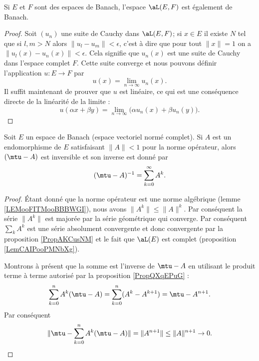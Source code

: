\begin{lemma}       \label{LemCAIPooPMNbXg}
    Si \( E\) et \( F\) sont des espaces de Banach, l'espace \( \aL(E,F)\) est également de Banach.
\end{lemma}

\begin{proof}
    Soit \( (u_n)\) une suite de Cauchy dans \( \aL(E,F)\); si \( x\in E\) il existe \( N\) tel que si \( l,m>N\) alors \( \| u_l-u_m \|<\epsilon\), c'est à dire que pour tout \( \| x \|=1\) on a \( \| u_l(x)-u_n(x) \|<\epsilon\). Cela signifie que \( u_n(x)\) est une suite de Cauchy dans l'espace complet \( F\). Cette suite converge et nous pouvons définir l'application \( u\colon E\to F\) par
    \begin{equation}
        u(x)=\lim_{n\to \infty} u_n(x).
    \end{equation}
    Il suffit maintenant de prouver que \( u\) est linéaire, ce qui est une conséquence directe de la linéarité de la limite :
    \begin{equation}
        u(\alpha x+\beta y)=\lim_{n\to \infty} \big( \alpha u_n(x)+\beta u_n(y) \big).
    \end{equation}
\end{proof}

\begin{proposition}     \label{PropQAjqUNp}
    Soit \( E\) un espace de Banach (espace vectoriel normé complet). Si \( A\) est un endomorphisme de \( E\) satisfaisant  \( \| A \|<1\) pour la norme opérateur, alors \( (\mtu-A)\) est inversible et son inverse est donné par
    \begin{equation}
        (\mtu-A)^{-1}=\sum_{k=0}^{\infty}A^k.
    \end{equation}
\end{proposition}

\begin{proof}
    Étant donné que la norme opérateur est une norme algébrique (lemme \ref{LEMooFITMooBBBWGI}), nous avons \( \| A^k \|\leq \| A \|^k\). Par conséquent la série \( \| A^k \|\) est majorée par la série géométrique qui converge. Par conséquent \( \sum_{k}A^k\) est une série absolument convergente et donc convergente par la proposition \ref{PropAKCusNM} et le fait que \( \aL(E)\) est complet (proposition \ref{LemCAIPooPMNbXg}).
    
    Montrons à présent que la somme est l'inverse de \( \mtu-A\) en utilisant le produit terme à terme autorisé par la proposition \ref{PropQXqEPuG} :
    \begin{equation}
        \sum_{k=0}^nA^k(\mtu-A)=\sum_{k=0}^n(A^k-A^{k+1})=\mtu-A^{n+1}.
    \end{equation}
    Par conséquent 
    \begin{equation}
        \| \mtu-\sum_{k=0}^nA^k(\mtu-A) \|=\| A^{n+1} \|\leq \| A \|^{n+1}\to 0.
    \end{equation}
\end{proof}

